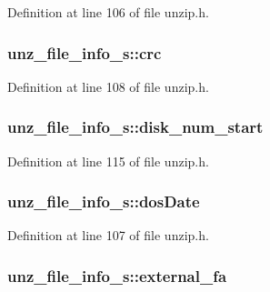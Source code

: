 Definition at line 106 of file unzip.\-h.

\hypertarget{structunz__file__info__s_a6d741cb2df07794d7a4794841148893b}{
\subsubsection[{crc}]{ unz\-\_\-file\-\_\-info\-\_\-s\-::crc}}\label{structunz__file__info__s_a6d741cb2df07794d7a4794841148893b}


Definition at line 108 of file unzip.\-h.

\hypertarget{structunz__file__info__s_ab7bfba2b7d0cdb7260a7cd9f9ccd00ff}{
\subsubsection[{disk\-\_\-num\-\_\-start}]{ unz\-\_\-file\-\_\-info\-\_\-s\-::disk\-\_\-num\-\_\-start}}\label{structunz__file__info__s_ab7bfba2b7d0cdb7260a7cd9f9ccd00ff}


Definition at line 115 of file unzip.\-h.

\hypertarget{structunz__file__info__s_a14bd7da84cada0f4b1455d60274eef91}{
\subsubsection[{dos\-Date}]{ unz\-\_\-file\-\_\-info\-\_\-s\-::dos\-Date}}\label{structunz__file__info__s_a14bd7da84cada0f4b1455d60274eef91}


Definition at line 107 of file unzip.\-h.

\hypertarget{structunz__file__info__s_ae3365fdb260668fca60bfb975b1513aa}{
\subsubsection[{external\-\_\-fa}]{ unz\-\_\-file\-\_\-info\-\_\-s\-::external\-\_\-fa}}\label{structunz__file__info__s_ae3365fdb260668fca60bfb975b1513aa}


